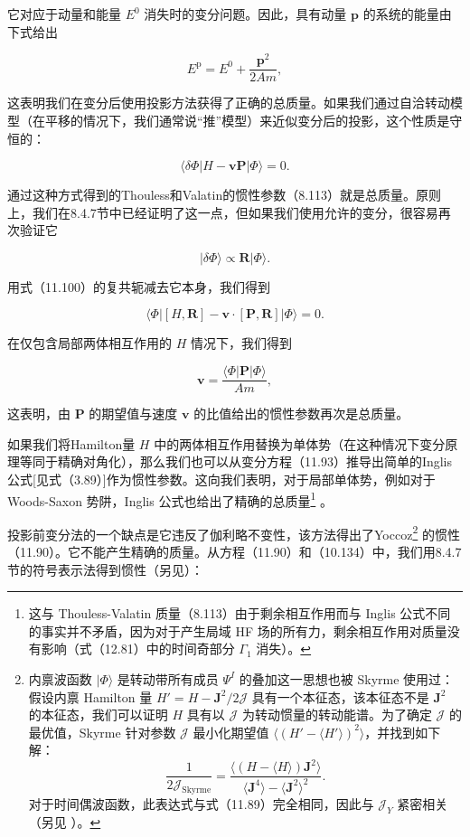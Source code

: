 它对应于动量和能量 ${E}^{0}$ 消失时的变分问题。因此，具有动量 $\boldsymbol{p}$ 的系统的能量由下式给出

\[
{E}^{\mathrm{p}}={E}^{0}+\frac{{\boldsymbol{p}}^{2}}{2Am},\tag{11.99}
\]

这表明我们在变分后使用投影方法获得了正确的总质量。如果我们通过自洽转动模型\cite{Gr60}（在平移的情况下，我们通常说“推”模型）来近似变分后的投影，这个性质是守恒的：

\[
\langle{\delta\Phi}\left|{H-\boldsymbol{v}\boldsymbol{P}}\right|\Phi\rangle=0.\tag{11.100}
\]

通过这种方式得到的Thouless和Valatin的惯性参数（8.113）就是总质量。原则上，我们在8.4.7节中已经证明了这一点，但如果我们使用允许的变分，很容易再次验证它

\[
|\delta\Phi\rangle\propto\boldsymbol{R}|\Phi\rangle.\tag{11.101}
\]

用式（11.100）的复共轭减去它本身，我们得到

\[
\langle\Phi\left|{\left\lbrack {H,\boldsymbol{R}}\right\rbrack -\boldsymbol{v}\cdot\left\lbrack {\boldsymbol{P},\boldsymbol{R}}\right\rbrack }\right|\Phi\rangle=0.\tag{11.102}
\]

在仅包含局部两体相互作用的 $H$ 情况下，我们得到

\[
\boldsymbol{v}=\frac{\langle\Phi\left|\boldsymbol{P}\right|\Phi\rangle}{Am},\tag{11.103}
\]

这表明，由 $\boldsymbol{P}$ 的期望值与速度 $\boldsymbol{v}$ 的比值给出的惯性参数再次是总质量。

如果我们将Hamilton量 $H$ 中的两体相互作用替换为单体势（在这种情况下变分原理等同于精确对角化），那么我们也可以从变分方程（11.93）推导出简单的Inglis公式{[}见式（3.89）{]}作为惯性参数。这向我们表明，对于局部单体势，例如对于
Woods-Saxon 势阱，Inglis 公式也给出了精确的总质量\footnote{这与 Thouless-Valatin 质量（8.113）由于剩余相互作用而与 Inglis 公式不同的事实并不矛盾，因为对于产生局域
HF 场的所有力，剩余相互作用对质量没有影响（式（12.81）中的时间奇部分 $\Gamma_{1}$ 消失）。} \cite{Vi63}。

投影前变分法的一个缺点是它违反了伽利略不变性，该方法得出了Yoccoz\footnote{内禀波函数 $|\Phi\rangle$ 是转动带所有成员 $\Psi^{I}$ 的叠加这一思想也被 Skyrme \cite{Sk57}
使用过：假设内禀 Hamilton 量 $H'=H-\boldsymbol{J}^{2}/2\mathcal{J}$ 具有一个本征态，该本征态不是
$\boldsymbol{J}^{2}$ 的本征态，我们可以证明 \cite{Li60a} $H$ 具有以 $\mathcal{J}$
为转动惯量的转动能谱。为了确定 $\mathcal{J}$ 的最优值，Skyrme 针对参数 $\mathcal{J}$ 最小化期望值
$\langle(H'-\langle H'\rangle)^{2}\rangle$，并找到如下解：
\[
\frac{1}{2\mathcal{J}_{\text{Skyrme}}}=\frac{\langle(H-\langle H\rangle)\boldsymbol{J}^{2}\rangle}{\langle\boldsymbol{J}^{4}\rangle-\langle\boldsymbol{J}^{2}\rangle^{2}}.
\]
对于时间偶波函数，此表达式与式（11.89）完全相同，因此与 $\mathcal{J}_{Y}$ 紧密相关（另见 \cite{Wo75}）。} 的惯性（11.90）。它不能产生精确的质量。从方程（11.90）和（10.134）中，我们用8.4.7节的符号表示法得到惯性（另见\cite{FW70}）：

